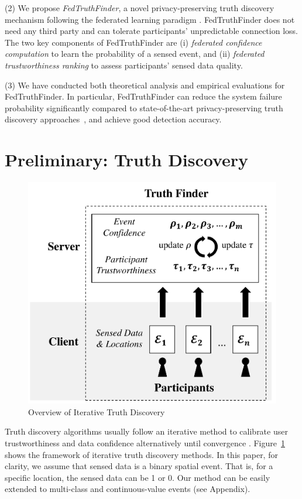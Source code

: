 \documentclass[11pt]{article}
\begin{document}
(2) We propose \textit{FedTruthFinder}, a novel privacy-preserving truth discovery mechanism following the federated learning paradigm \cite{Leye-yang2019federated}. FedTruthFinder does not need any third party and can tolerate participants' unpredictable connection loss. The two key components of FedTruthFinder are (i) \textit{federated confidence computation} to learn the probability of a sensed event, and (ii) \textit{federated trustworthiness ranking} to assess participants' sensed data quality.

(3) We have conducted both theoretical analysis and empirical evaluations for FedTruthFinder. In particular, FedTruthFinder can reduce the system failure probability significantly compared to state-of-the-art privacy-preserving truth discovery approaches~\cite{Leye-Bonawitz2017PracticalSA,Leye-Xu2019EfficientAP}, and achieve good detection accuracy.


\section{Preliminary: Truth Discovery}
\label{sec:preliminary}

\begin{figure}
	\centering
	\includegraphics[width=.5\linewidth]{submissions/LeyeWang/fig/truthfinder.pdf}
	\caption{Overview of Iterative Truth Discovery}
	\label{fig:truthfinder}
	\vspace{-1em}
\end{figure}


Truth discovery algorithms usually follow an iterative method to calibrate user trustworthiness and data confidence alternatively until convergence \cite{Leye-yin2008truth}. Figure~\ref{fig:truthfinder} shows the framework of iterative truth discovery methods. In this paper, for clarity, we assume that sensed data is a binary spatial event. That is, for a specific location, the sensed data can be 1 or 0. Our method can be easily extended to multi-class and continuous-value events (see Appendix).
\end{document}
